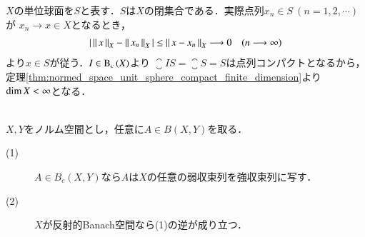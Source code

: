 	\begin{prf}
		$X$の単位球面を$S$と表す．$S$は$X$の閉集合である．実際点列$x_n \in S\ (n=1,2,\cdots)$が
		$x_n \rightarrow x \in X$となるとき，
		\begin{align}
			\left|\, \left\|\, x\, \right\|_{X} - \left\|\, x_n\, \right\|_{X}\, \right| \leq \left\|\, x - x_n\, \right\|_{X} \longrightarrow 0
			\quad (n \longrightarrow \infty)
		\end{align}
		より$x \in S$が従う．$I \in \mathrm{B}_c\left(X\right) $より
		$\closure{IS} = \closure{S} = S$は点列コンパクトとなるから，
		定理\ref{thm:normed_space_unit_sphere_compact_finite_dimension}より$\operatorname{dim} X < \infty$となる．
		\QED
	\end{prf}
	
	\begin{screen}
		\begin{thm}[コンパクト作用素は弱収束列を強収束列に写す]\mbox{}\\
			$X,Y$をノルム空間とし，任意に$A \in B(X,Y)$を取る．
			\begin{description}
				\item[(1)] $A \in B_c(X,Y)$なら$A$は$X$の任意の弱収束列を強収束列に写す．
				\item[(2)] $X$が反射的Banach空間なら(1)の逆が成り立つ．
			\end{description}
		\end{thm}
	\end{screen}
	
